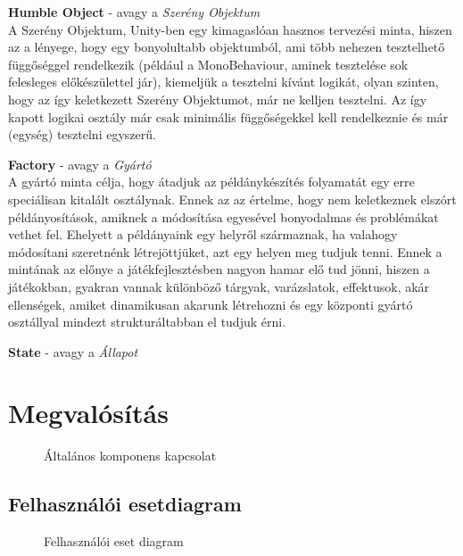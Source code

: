 \textbf{Humble Object} - avagy a \textit{Szerény Objektum}\\
A Szerény Objektum, Unity-ben egy kimagaslóan hasznos tervezési minta, hiszen az a lényege, hogy egy bonyolultabb objektumból, ami több nehezen tesztelhető függőséggel rendelkezik (például a MonoBehaviour, aminek tesztelése sok felesleges előkészülettel jár), kiemeljük a tesztelni kívánt logikát, olyan szinten, hogy az így keletkezett Szerény Objektumot, már ne kelljen tesztelni. Az így kapott logikai osztály már csak minimális függőségekkel kell rendelkeznie és már (egység) tesztelni egyszerű.

\textbf{Factory} - avagy a \textit{Gyártó}\\
A gyártó minta célja, hogy átadjuk az példánykészítés folyamatát egy erre speciálisan kitalált osztálynak. Ennek az az értelme, hogy nem keletkeznek elszórt példányosítások, amiknek a módosítása egyesével bonyodalmas és problémákat vethet fel. Ehelyett a példányaink egy helyről származnak, ha valahogy módosítani szeretnénk létrejöttjüket, azt egy helyen meg tudjuk tenni. Ennek a mintának az előnye a játékfejlesztésben nagyon hamar elő tud jönni, hiszen a játékokban, gyakran vannak különböző tárgyak, varázslatok, effektusok, akár ellenségek, amiket dinamikusan akarunk létrehozni és egy központi gyártó osztállyal mindezt strukturáltabban el tudjuk érni.

\textbf{State} - avagy a \textit{Állapot}\\

\cleardoublepage
\section{Megvalósítás}

\begin{figure}[H]
	\noindent{}
	\caption{Általános komponens kapcsolat}
	\label{GeneralComponentSystem}
\end{figure}

\subsection{Felhasználói esetdiagram} 
\begin{figure}[H]
	\noindent{}
	\caption{Felhasználói eset diagram}
	\label{useCase}
\end{figure}

